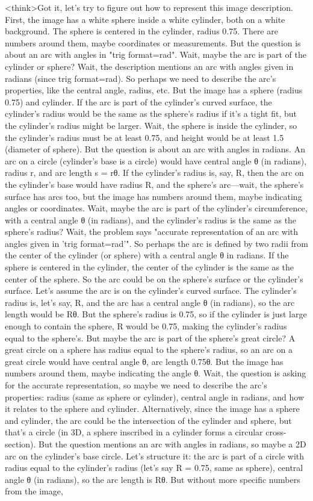 <think>Got it, let's try to figure out how to represent this image description. First, the image has a white sphere inside a white cylinder, both on a white background. The sphere is centered in the cylinder, radius 0.75. There are numbers around them, maybe coordinates or measurements. But the question is about an arc with angles in "trig format=rad". Wait, maybe the arc is part of the cylinder or sphere? Wait, the description mentions an arc with angles given in radians (since trig format=rad). So perhaps we need to describe the arc's properties, like the central angle, radius, etc. But the image has a sphere (radius 0.75) and cylinder. If the arc is part of the cylinder's curved surface, the cylinder's radius would be the same as the sphere's radius if it's a tight fit, but the cylinder's radius might be larger. Wait, the sphere is inside the cylinder, so the cylinder's radius must be at least 0.75, and height would be at least 1.5 (diameter of sphere). But the question is about an arc with angles in radians. An arc on a circle (cylinder's base is a circle) would have central angle θ (in radians), radius r, and arc length s = rθ. If the cylinder's radius is, say, R, then the arc on the cylinder's base would have radius R, and the sphere's arc—wait, the sphere's surface has arcs too, but the image has numbers around them, maybe indicating angles or coordinates. Wait, maybe the arc is part of the cylinder's circumference, with a central angle θ (in radians), and the cylinder's radius is the same as the sphere's radius? Wait, the problem says "accurate representation of an arc with angles given in 'trig format=rad'". So perhaps the arc is defined by two radii from the center of the cylinder (or sphere) with a central angle θ in radians. If the sphere is centered in the cylinder, the center of the cylinder is the same as the center of the sphere. So the arc could be on the sphere's surface or the cylinder's surface. Let's assume the arc is on the cylinder's curved surface. The cylinder's radius is, let's say, R, and the arc has a central angle θ (in radians), so the arc length would be Rθ. But the sphere's radius is 0.75, so if the cylinder is just large enough to contain the sphere, R would be 0.75, making the cylinder's radius equal to the sphere's. But maybe the arc is part of the sphere's great circle? A great circle on a sphere has radius equal to the sphere's radius, so an arc on a great circle would have central angle θ, arc length 0.75θ. But the image has numbers around them, maybe indicating the angle θ. Wait, the question is asking for the accurate representation, so maybe we need to describe the arc's properties: radius (same as sphere or cylinder), central angle in radians, and how it relates to the sphere and cylinder. Alternatively, since the image has a sphere and cylinder, the arc could be the intersection of the cylinder and sphere, but that's a circle (in 3D, a sphere inscribed in a cylinder forms a circular cross-section). But the question mentions an arc with angles in radians, so maybe a 2D arc on the cylinder's base circle. Let's structure it: the arc is part of a circle with radius equal to the cylinder's radius (let's say R = 0.75, same as sphere), central angle θ (in radians), so the arc length is Rθ. But without more specific numbers from the image, 